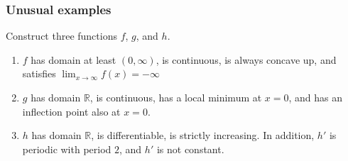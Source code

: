 \documentclass[14pt]{beamer}
\begin{document}
	\begin{frame}[t]
		\frametitle{Unusual examples}

		Construct three functions $f$, $g$, and $h$.

		\begin{enumerate}
			\item $f$ has domain at least $(0,\infty)$, is continuous, is always concave
				up, and satisfies $\displaystyle \lim_{x \to \infty}f(x) = - \infty$

			\item $g$ has domain $\mathbb{R}$, is continuous, has a local minimum at $x
				=0$, and has an inflection point also at $x=0$.

			\item $h$ has domain $\mathbb{R}$, is differentiable, is strictly increasing.
				In addition, $h'$ is periodic with period $2$, and $h'$ is not constant.
		\end{enumerate}
	\end{frame}


\end{document}
